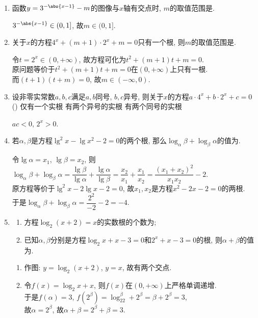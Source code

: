 \begin{enumerate}
\begin{jieda}
    \end{jieda}
    \item 函数$y=3^{-\abs{x-1}}-m$的图像与$x$轴有交点时, $m$的取值范围是\blkda{$(0,1]$}. 
    \begin{jieda}
    $3^{-\abs{x-1}}\in(0,1]$, 故$m\in(0,1]$. 
    \end{jieda}
    \item 关于$x$的方程$4^x+(m+1)\cdot2^x+m=0$只有一个根, 则$m$的取值范围是. 
    \begin{jieda}
    令$t=2^x\in(0,+\infty)$, 故方程可化为$t^2+(m+1)t+m=0$. \\
    原问题等价于$t^2+(m+1)t+m=0$在$(0,+\infty)$上只有一根. \\
    而$(t+1)(t+m)=0$, 故$m\in(-\infty,0)$.  
    \end{jieda}
    \item 设非零实常数$a,b,c$满足$a,b$同号, $b,c$异号, 则关于$x$的方程$a\cdot4^x+b\cdot2^x+c=0$\dotfill()
    {仅有一个实根}
    {有两个异号的实根}
    {有两个同号的实根}
    \begin{jieda}
    $ac<0$, $2^x>0$. 
    \end{jieda}

    \item 若$\alpha,\beta$是方程$\lg^2x-\lg{x^2}-2=0$的两个根, 那么$\log_{\alpha}\beta+\log_{\beta}\alpha$的值为. 
    
    \begin{jieda}
    令$\lg\alpha=x_1$, $\lg\beta=x_2$, 则$\log_{\alpha}\beta+\log_{\beta}\alpha=\dfrac{\lg\beta}{\lg\alpha}+\dfrac{\lg\alpha}{\lg\beta}=\dfrac{x_2}{x_1}+\dfrac{x_1}{x_2}=\dfrac{(x_1+x_2)^2}{x_1x_2}-2$. \\
    原方程等价于$\lg^2x-2\lg{x}-2=0$, 故$x_1,x_2$是方程$x^2-2x-2=0$的两根. \\
    于是$\log_{\alpha}\beta+\log_{\beta}\alpha=\dfrac{2^2}{-2}-2=-4$. 
    \end{jieda}

    \item
    \begin{enumerate}[(1)]
    \item 方程$\log_2(x+2)=x$的实数根的个数为; 
    \item 已知$\alpha,\beta$分别是方程$\log_2x+x-3=0$和$2^x+x-3=0$的根, 则$\alpha+\beta$的值为. 
    \end{enumerate}
    \begin{jieda}
    \begin{enumerate}[(1)]
    \item 作图: $y=\log_2(x+2)$, $y=x$, 故有两个交点. 
    \item 令$f(x)=\log_2x+x$, 则$f(x)$在$(0,+\infty)$上严格单调递增. \\
    于是$f(\alpha)=3$, $f(2^{\beta})=\log_22^{\beta}+2^{\beta}=\beta+2^{\beta}=3$, \\
    故$\alpha=2^\beta$, 故$\alpha+\beta=2^{\beta}+\beta=3$. 
    \end{enumerate}
    \end{jieda}


\end{enumerate}
